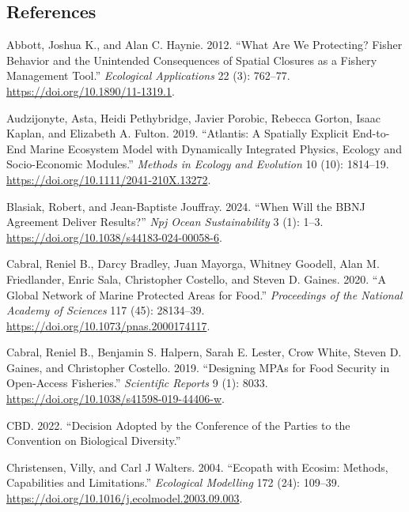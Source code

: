 \documentclass[
  default,
  lineno,
  referee]{sn-jnl}
\newlength{\cslhangindent}
\newenvironment{CSLReferences}[2] %
 {\begin{list}{}{%
  \setlength{\itemindent}{0pt}
  \setlength{\leftmargin}{0pt}
  \setlength{\parsep}{0pt}
  \ifodd #1
   \setlength{\leftmargin}{\cslhangindent}
   \setlength{\itemindent}{-1\cslhangindent}
  \fi
  \setlength{\itemsep}{#2\baselineskip}}}
 {\end{list}}
\begin{document}
\subsection{References}\label{references}

\label{refs}
\begin{CSLReferences}{1}{0}
Abbott, Joshua K., and Alan C. Haynie. 2012. {``What Are We Protecting?
Fisher Behavior and the Unintended Consequences of Spatial Closures as a
Fishery Management Tool.''} \emph{Ecological Applications} 22 (3):
762--77. \url{https://doi.org/10.1890/11-1319.1}.

Audzijonyte, Asta, Heidi Pethybridge, Javier Porobic, Rebecca Gorton,
Isaac Kaplan, and Elizabeth A. Fulton. 2019. {``Atlantis: A Spatially
Explicit End-to-End Marine Ecosystem Model with Dynamically Integrated
Physics, Ecology and Socio-Economic Modules.''} \emph{Methods in Ecology
and Evolution} 10 (10): 1814--19.
\url{https://doi.org/10.1111/2041-210X.13272}.

Blasiak, Robert, and Jean-Baptiste Jouffray. 2024. {``When Will the BBNJ
Agreement Deliver Results?''} \emph{Npj Ocean Sustainability} 3 (1):
1--3. \url{https://doi.org/10.1038/s44183-024-00058-6}.

Cabral, Reniel B., Darcy Bradley, Juan Mayorga, Whitney Goodell, Alan M.
Friedlander, Enric Sala, Christopher Costello, and Steven D. Gaines.
2020. {``A Global Network of Marine Protected Areas for Food.''}
\emph{Proceedings of the National Academy of Sciences} 117 (45):
28134--39. \url{https://doi.org/10.1073/pnas.2000174117}.

Cabral, Reniel B., Benjamin S. Halpern, Sarah E. Lester, Crow White,
Steven D. Gaines, and Christopher Costello. 2019. {``Designing MPAs for
Food Security in Open-Access Fisheries.''} \emph{Scientific Reports} 9
(1): 8033. \url{https://doi.org/10.1038/s41598-019-44406-w}.

CBD. 2022. {``Decision Adopted by the Conference of the Parties to the
Convention on Biological Diversity.''}

Christensen, Villy, and Carl J Walters. 2004. {``Ecopath with Ecosim:
Methods, Capabilities and Limitations.''} \emph{Ecological Modelling}
172 (2{\textendash}4): 109--39.
\url{https://doi.org/10.1016/j.ecolmodel.2003.09.003}.


\end{CSLReferences}
\end{document}
